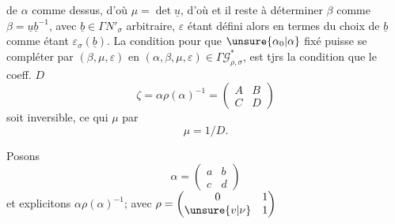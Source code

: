de $\alpha$ comme dessus, d'où $\mu=\det\underline u$, d'où
et il  
reste à déterminer $\beta$ comme
$\beta=\underline u\underline b^{-1}$, avec $\underline b\in\Gamma N'_\sigma$
arbitraire, $\varepsilon$ étant défini alors en termes du choix de $\underline b$
comme étant $\varepsilon_\sigma(\underline b)$. La condition pour que
$\unsure{\alpha_0|\alpha}$ fixé puisse se compléter par $(\beta,\mu,\varepsilon)$
en $(\alpha,\beta,\mu,\varepsilon)\in\Gamma\mathcal G^*_{\rho,\sigma}$,
est tjrs la condition que le coeff. $D$ 
\[
\tag{33}
\zeta=\alpha\rho(\alpha)^{-1}=\begin{pmatrix}A&B\\C&D\end{pmatrix}
\]
soit inversible, ce qui   $\mu$ par
\[
\tag{34}
\mu=1/D.
\]

Posons
\[
\tag{35}
\alpha=\begin{pmatrix}a&b\\c&d\end{pmatrix}
\]
et explicitons $\alpha\rho(\alpha)^{-1}$; avec
$\rho=\begin{pmatrix}0&1\\\unsure{v|\nu}&1\end{pmatrix}$

